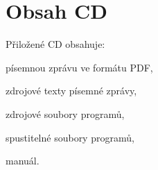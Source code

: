 \chapter{Obsah CD}

Přiložené CD obsahuje:
\begin{itemize*}
\item písemnou zprávu ve formátu PDF,
\item zdrojové texty písemné zprávy,
\item zdrojové soubory programů,
\item spustitelné soubory programů,
\item manuál.
\end{itemize*}



